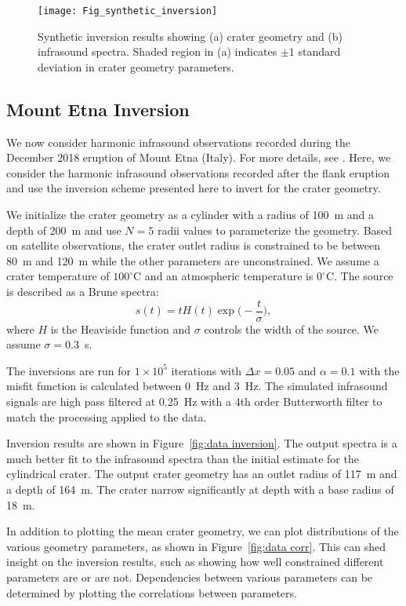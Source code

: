\documentclass[10pt]{article}
\begin{document}
\begin{figure}[h!]
\centering
\texttt{[image: Fig\_synthetic\_inversion]}
\caption{Synthetic inversion results showing (a) crater geometry and (b) infrasound spectra. Shaded region in (a) indicates $\pm1$ standard deviation in crater geometry parameters.}
\label{fig:syn inversion}
\end{figure}

\subsection{Mount Etna Inversion}
We now consider harmonic infrasound observations recorded during the December 2018 eruption of Mount Etna (Italy). For more details, see \cite{Watson2020_GRL}. Here, we consider the harmonic infrasound observations recorded after the flank eruption and use the inversion scheme presented here to invert for the crater geometry. 

We initialize the crater geometry as a cylinder with a radius of 100~m and a depth of 200~m and use $N=5$ radii values to parameterize the geometry. Based on satellite observations, the crater outlet radius is constrained to be between 80~m and 120~m while the other parameters are unconstrained. We assume a crater temperature of $100^\circ$C and an atmospheric temperature is $0^\circ$C. The source is described as a Brune spectra:
\begin{equation}
s(t) = t H(t) \exp\bigg(-\frac{t}{\sigma} \bigg),
\end{equation}
where $H$ is the Heaviside function and $\sigma$ controls the width of the source. We assume $\sigma=0.3$~s.

The inversions are run for $1\times10^5$ iterations with $\Delta x = 0.05$ and $\alpha = 0.1$ with the misfit function is calculated between 0~Hz and 3~Hz. The simulated infrasound signals are high pass filtered at 0.25~Hz with a 4th order Butterworth filter to match the processing applied to the data.

Inversion results are shown in Figure~\ref{fig:data inversion}. The output spectra is a much better fit to the infrasound spectra than the initial estimate for the cylindrical crater. The output crater geometry has an outlet radius of 117~m and a depth of 164~m. The crater narrow significantly at depth with a base radius of 18~m.

In addition to plotting the mean crater geometry, we can plot distributions of the various geometry parameters, as shown in Figure~\ref{fig:data corr}. This can shed insight on the inversion results, such as showing how well constrained different parameters are or are not. Dependencies between various parameters can be determined by plotting the correlations between parameters.
\end{document}
